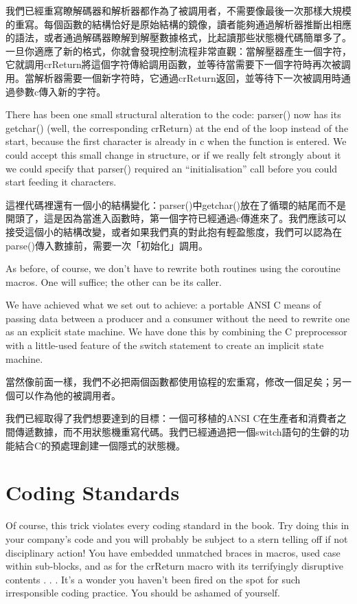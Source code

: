 \documentclass[12pt]{article}
\begin{document}
\begin{CJK}{UTF8}{bsmi}
我們已經重寫瞭解碼器和解析器都作為了被調用者，不需要像最後一次那樣大規模的重寫。每個函數的結構恰好是原始結構的鏡像，讀者能夠通過解析器推斷出相應的語法，或者通過解碼器瞭解到解壓數據格式，比起讀那些狀態機代碼簡單多了。一旦你適應了新的格式，你就會發現控制流程非常直觀：當解壓器產生一個字符，它就調用crReturn將這個字符傳給調用函數，並等待當需要下一個字符時再次被調用。當解析器需要一個新字符時，它通過crReturn返回，並等待下一次被調用時通過參數c傳入新的字符。

There has been one small structural alteration to the code: parser() now has its getchar() (well, the corresponding crReturn) at the end of the loop instead of the start, because the first character is already in c when the function is entered. We could accept this small change in structure, or if we really felt strongly about it we could specify that parser() required an ``initialisation'' call before you could start feeding it characters.

這裡代碼裡還有一個小的結構變化：parser()中getchar()放在了循環的結尾而不是開頭了，這是因為當進入函數時，第一個字符已經通過c傳進來了。我們應該可以接受這個小的結構改變，或者如果我們真的對此抱有輕盈態度，我們可以認為在parse()傳入數據前，需要一次「初始化」調用。 

As before, of course, we don't have to rewrite both routines using the coroutine macros. One will suffice; the other can be its caller.

We have achieved what we set out to achieve: a portable ANSI C means of passing data between a producer and a consumer without the need to rewrite one as an explicit state machine. We have done this by combining the C preprocessor with a little-used feature of the switch statement to create an implicit state machine.

 當然像前面一樣，我們不必把兩個函數都使用協程的宏重寫，修改一個足矣；另一個可以作為他的被調用者。

 我們已經取得了我們想要達到的目標：一個可移植的ANSI C在生產者和消費者之間傳遞數據，而不用狀態機重寫代碼。我們已經通過把一個switch語句的生僻的功能結合C的預處理創建一個隱式的狀態機。 

\section{Coding Standards}

Of course, this trick violates every coding standard in the book. Try doing this in your company's code and you will probably be subject to a stern telling off if not disciplinary action! You have embedded unmatched braces in macros, used case within sub-blocks, and as for the crReturn macro with its terrifyingly disruptive contents . . . It's a wonder you haven't been fired on the spot for such irresponsible coding practice. You should be ashamed of yourself.


\end{CJK}
\end{document}
